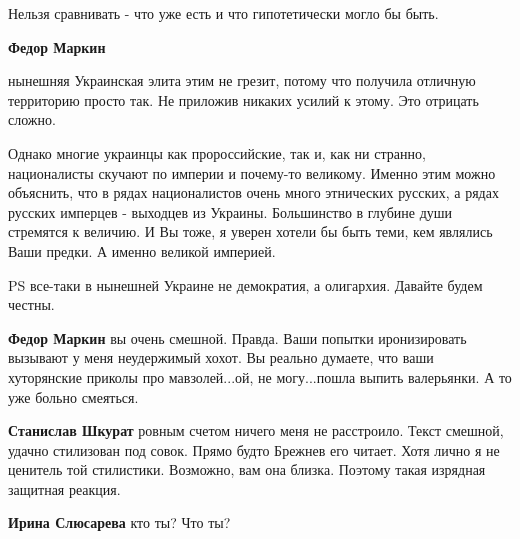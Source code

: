 \begin{itemize}
\begin{itemize}
Нельзя сравнивать - что уже есть и что гипотетически могло бы быть.

 
\textbf{Федор Маркин} 

нынешняя Украинская элита этим не грезит, потому что получила отличную
территорию просто так. Не приложив никаких усилий к этому. Это отрицать сложно.

Однако многие украинцы как пророссийские, так и, как ни странно, националисты
скучают по империи и почему-то великому. Именно этим можно объяснить, что в
рядах националистов очень много этнических русских, а рядах русских имперцев -
выходцев из Украины. Большинство в глубине души стремятся к величию. И Вы тоже,
я уверен хотели бы быть теми, кем являлись Ваши предки. А именно великой
империей.

PS все-таки в нынешней Украине не демократия, а олигархия. Давайте будем
честны.

 
\textbf{Федор Маркин} вы очень смешной. Правда. Ваши попытки иронизировать вызывают у меня неудержимый хохот. Вы реально думаете, что ваши хуторянские приколы про мавзолей...ой, не могу...пошла выпить валерьянки. А то уже больно смеяться.

 
\textbf{Станислав Шкурат} ровным счетом ничего меня не расстроило. Текст смешной, удачно стилизован под совок. Прямо будто Брежнев его читает. Хотя лично я не ценитель той стилистики. Возможно, вам она близка. Поэтому такая изрядная защитная реакция.

 
\textbf{Ирина Слюсарева} кто ты?
Что ты?


\end{itemize}
\end{itemize}
